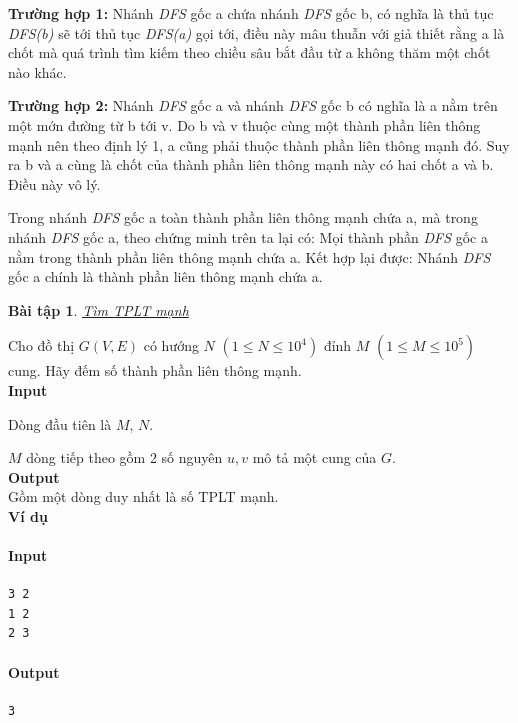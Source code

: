 \documentclass{article}
\newtheorem{baitap}{Bài tập}
\begin{document}
\textbf{Trường hợp 1:} Nhánh \textit{DFS} gốc a chứa nhánh \textit{DFS} gốc b, có nghĩa là thủ tục \textit{DFS(b)} sẽ tới thủ tục \textit{DFS(a)} gọi tới, điều này mâu thuẫn với giả thiết rằng a là chốt mà quá trình tìm kiếm theo chiều sâu bắt đầu từ a không thăm một chốt nào khác.

\textbf{Trường hợp 2:} Nhánh \textit{DFS} gốc a và nhánh \textit{DFS} gốc b có nghĩa là a nằm trên một mớn đường từ b tới v. Do b và v thuộc cùng một thành phần liên thông mạnh nên theo định lý 1, a cũng phải thuộc thành phần liên thông mạnh đó. Suy ra b và a cùng là chốt của thành phần liên thông mạnh này có hai chốt a và b. Điều này vô lý.

Trong nhánh \textit{DFS} gốc a toàn thành phần liên thông mạnh chứa a, mà trong nhánh \textit{DFS} gốc a, theo chứng minh trên ta lại có: Mọi thành phần \textit{DFS} gốc a nằm trong thành phần liên thông mạnh chứa a. Kết hợp lại được: Nhánh \textit{DFS} gốc a chính là thành phần liên thông mạnh chứa a.

\begin{baitap}
    \href{https://oj.vnoi.info/problem/tjalg}{Tìm TPLT mạnh}
\end{baitap}

Cho đồ thị $G(V, E)$ có hướng $N$ $(1\leq N \leq 10^4)$ đỉnh $M$ $(1 \leq M \leq 10^5)$ cung. Hãy đếm số thành phần liên thông mạnh.\\

\textbf{Input}

Dòng đầu tiên là $M$, $N$.

$M$ dòng tiếp theo gồm 2 số nguyên $u, v$ mô tả một cung của $G$.\\

\textbf{Output} \\

Gồm một dòng duy nhất là số TPLT mạnh.\\

\textbf{Ví dụ}

\paragraph{Input}
\begin{lstlisting}
3 2
1 2
2 3
\end{lstlisting}

\paragraph{Output}
\begin{lstlisting}
3
\end{lstlisting}
\end{document}
